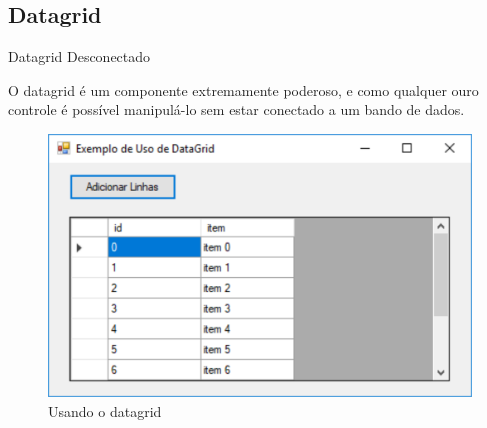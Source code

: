 


\subsection{Datagrid}

\begin{frame}



\begin{CaixaModelo01}{Datagrid Desconectado}
	
	O datagrid é um componente extremamente poderoso, e como qualquer ouro controle é
	possível manipulá-lo sem estar conectado a um bando de dados.
	
		\begin{figure}
		\includegraphics[scale=.45]{./Figuras/F07_Datagrid01.png}
		\caption{Usando o datagrid}
		\label{fig:Datagrid01}
	\end{figure}


\end{CaixaModelo01}

\end{frame}

